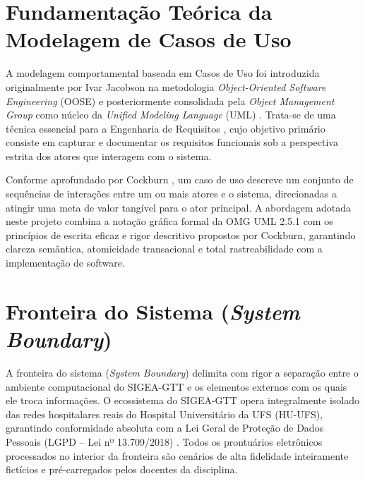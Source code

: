 \section{Fundamentação Teórica da Modelagem de Casos de Uso}
\label{sec_fundamentacao_teorica}

A modelagem comportamental baseada em Casos de Uso foi introduzida originalmente por Ivar Jacobson \cite{jacobson1992} na metodologia \textit{Object-Oriented Software Engineering} (OOSE) e posteriormente consolidada pela \textit{Object Management Group} como núcleo da \textit{Unified Modeling Language} (UML) \cite{omg2017}. Trata-se de uma técnica essencial para a Engenharia de Requisitos \cite{iso29148, pressman2021}, cujo objetivo primário consiste em capturar e documentar os requisitos funcionais sob a perspectiva estrita dos atores que interagem com o sistema.

Conforme aprofundado por Cockburn \cite{cockburn2000}, um caso de uso descreve um conjunto de sequências de interações entre um ou mais atores e o sistema, direcionadas a atingir uma meta de valor tangível para o ator principal. A abordagem adotada neste projeto combina a notação gráfica formal da OMG UML 2.5.1 com os princípios de escrita eficaz e rigor descritivo propostos por Cockburn, garantindo clareza semântica, atomicidade transacional e total rastreabilidade com a implementação de software.

\section{Fronteira do Sistema (\textit{System Boundary})}
\label{sec_fronteira_sistema}

A fronteira do sistema (\textit{System Boundary}) delimita com rigor a separação entre o ambiente computacional do SIGEA-GTT e os elementos externos com os quais ele troca informações. O ecossistema do SIGEA-GTT opera integralmente isolado das redes hospitalares reais do Hospital Universitário da UFS (HU-UFS), garantindo conformidade absoluta com a Lei Geral de Proteção de Dados Pessoais (LGPD -- Lei nº 13.709/2018) \cite{lgpd2018}. Todos os prontuários eletrônicos processados no interior da fronteira são cenários de alta fidelidade inteiramente fictícios e pré-carregados pelos docentes da disciplina.

